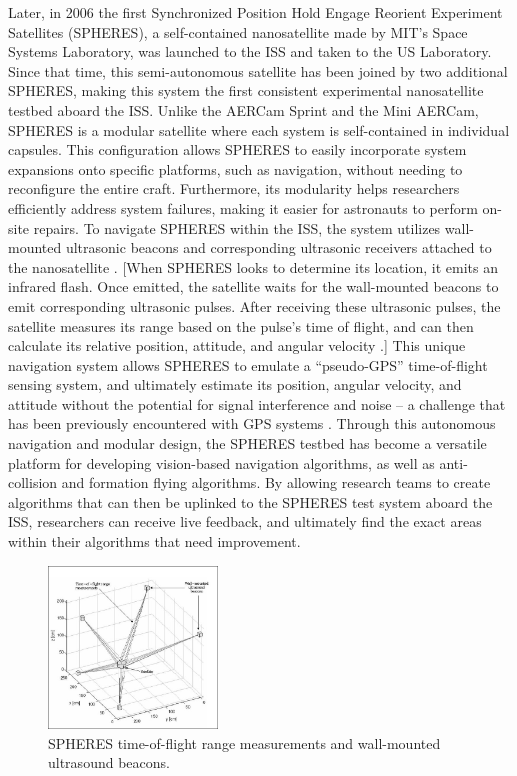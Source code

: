 \documentclass[journal, 10pt]{IEEEtran}
\begin{document}
Later, in 2006 the first Synchronized Position Hold Engage Reorient Experiment Satellites (SPHERES), a self-contained nanosatellite made by MIT's Space Systems Laboratory, was launched to the ISS and taken to the US Laboratory. Since that time, this semi-autonomous satellite has been joined by two additional SPHERES, making this system the first consistent experimental nanosatellite testbed aboard the ISS. Unlike the AERCam Sprint and the Mini AERCam, SPHERES is a modular satellite where each system is self-contained in individual capsules. This configuration allows SPHERES to easily incorporate system expansions onto specific platforms, such as navigation, without needing to reconfigure the entire craft. Furthermore, its modularity helps researchers efficiently address system failures, making it easier for astronauts to perform on-site repairs. To navigate SPHERES within the ISS, the system utilizes wall-mounted ultrasonic beacons and corresponding ultrasonic receivers attached to the nanosatellite \cite{SPHERES}. [When SPHERES looks to determine its location, it emits an infrared flash. Once emitted, the satellite waits for the wall-mounted beacons to emit corresponding ultrasonic pulses. After receiving these ultrasonic pulses, the satellite measures its range based on the pulse's time of flight, and can then calculate its relative position, attitude, and angular velocity \cite{SPHERES, Vertigo1}.] This unique navigation system allows SPHERES to emulate a ``pseudo-GPS'' time-of-flight sensing system, and ultimately estimate its position, angular velocity, and attitude without the potential for signal interference and noise -- a challenge that has been previously encountered with GPS systems \cite{Vertigo1}. Through this autonomous navigation and modular design, the SPHERES testbed has become a versatile platform for developing vision-based navigation algorithms, as well as anti-collision and formation flying algorithms. By allowing research teams to create algorithms that can then be uplinked to the SPHERES test system aboard the ISS, researchers can receive live feedback, and ultimately find the exact areas within their algorithms that need improvement.

\begin{figure}[spheres]
\begin{center}
\includegraphics[width=0.4\textwidth]{figures/Spheres_Auto10.pdf}
\caption{SPHERES time-of-flight range measurements and wall-mounted ultrasound beacons.}
\label{spheres_plot}
\end{center}
\end{figure}
\end{document}
